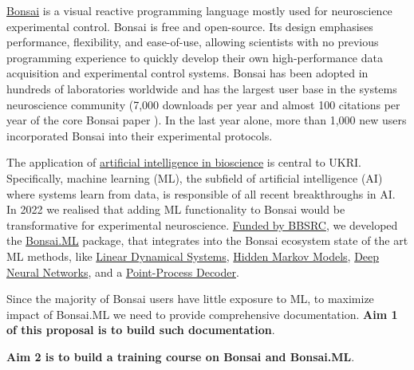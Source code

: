 \href{https://bonsai-rx.org/}{Bonsai} is a visual reactive programming language
mostly used for neuroscience experimental control.
%
Bonsai is free and open-source.  Its design emphasises performance,
flexibility, and ease-of-use, allowing scientists with no previous programming
experience to quickly develop their own high-performance data acquisition and
experimental control systems.
%
Bonsai has been adopted in hundreds of laboratories worldwide and has the
largest user base in the systems neuroscience community (7,000 downloads per
year and almost 100 citations per year of the core Bonsai paper
\citep{lopesEtAl15}). In the last year alone, more than 1,000 new users
incorporated Bonsai into their experimental protocols.

The application of
\href{https://www.ukri.org/what-we-do/browse-our-areas-of-investment-and-support/artificial-intelligence-in-bioscience/}{artificial
intelligence in bioscience} is central to UKRI.
%
Specifically, machine learning (ML), the subfield of artificial intelligence
(AI) where systems learn from data, is responsible of all recent breakthroughs
in AI.
%
In 2022 we realised that adding ML functionality to Bonsai would be
transformative for experimental neuroscience.
\href{https://gow.bbsrc.ukri.org/grants/AwardDetails.aspx?FundingReference=BB\%2FW019132\%2F1}{Funded
by BBSRC}, we developed the
\href{https://bonsai-rx.org/machinelearning/}{Bonsai.ML} package, that
integrates into the Bonsai ecosystem state of the art ML methods, like
\href{https://bonsai-rx.org/machinelearning/examples/examples/LinearDynamicalSystems/README.html}{Linear
Dynamical Systems},
\href{https://bonsai-rx.org/machinelearning/examples/examples/HiddenMarkovModels/README.html}{Hidden
Markov Models},
\href{https://bonsai-rx.org/machinelearning/examples/examples/Torch/NeuralNetsTrainedOnline/README.html}{Deep
Neural Networks}, and a
\href{https://bonsai-rx.org/machinelearning/examples/examples/PointProcessDecoder/DecodePositionFromHippocampusSortedUnits/README.html}{Point-Process
Decoder}.

Since the majority of Bonsai users have little exposure to ML, to
maximize impact of Bonsai.ML we need to provide comprehensive documentation.
\textbf{Aim 1 of this proposal is to build such documentation}.

\textbf{Aim 2 is to build a training course on Bonsai and Bonsai.ML}.

